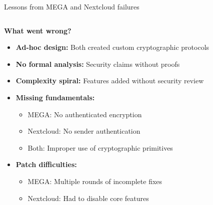 \documentclass[aspectratio=169, lualatex, handout]{beamer}
\begin{document}
\begin{frame}{Lessons from MEGA and Nextcloud failures}
	\begin{columns}[c]
		\begin{column}{1\textwidth}
			\textbf{What went wrong?}
			\begin{itemize}
				\item \textbf{Ad-hoc design:} Both created custom cryptographic protocols
				\item \textbf{No formal analysis:} Security claims without proofs
				\item \textbf{Complexity spiral:} Features added without security review
				\item \textbf{Missing fundamentals:}
				      \begin{itemize}
					      \item MEGA: No authenticated encryption
					      \item Nextcloud: No sender authentication
					      \item Both: Improper use of cryptographic primitives
				      \end{itemize}
				\item \textbf{Patch difficulties:}
				      \begin{itemize}
					      \item MEGA: Multiple rounds of incomplete fixes
					      \item Nextcloud: Had to disable core features
				      \end{itemize}
			\end{itemize}
		\end{column}
	\end{columns}
\end{frame}
\end{document}
